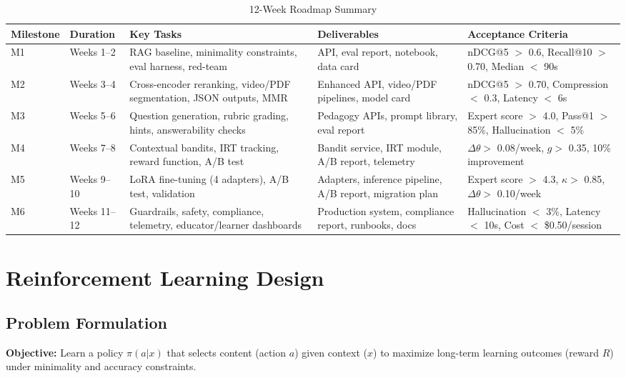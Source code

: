 \documentclass[11pt,letterpaper]{article}
\begin{document}
\begin{table}[H]
\centering
\tiny
\begin{tabular}{@{}p{1.5cm}p{2.5cm}p{4cm}p{3.5cm}p{2.5cm}@{}}
\toprule
\textbf{Milestone} & \textbf{Duration} & \textbf{Key Tasks} & \textbf{Deliverables} & \textbf{Acceptance Criteria} \\
\midrule
M1 & Weeks 1--2 & RAG baseline, minimality constraints, eval harness, red-team & API, eval report, notebook, data card & nDCG@5 $>$ 0.6, Recall@10 $>$ 0.70, Median $<$ 90s \\
M2 & Weeks 3--4 & Cross-encoder reranking, video/PDF segmentation, JSON outputs, MMR & Enhanced API, video/PDF pipelines, model card & nDCG@5 $>$ 0.70, Compression $<$ 0.3, Latency $<$ 6s \\
M3 & Weeks 5--6 & Question generation, rubric grading, hints, answerability checks & Pedagogy APIs, prompt library, eval report & Expert score $>$ 4.0, Pass@1 $>$ 85\%, Hallucination $<$ 5\% \\
M4 & Weeks 7--8 & Contextual bandits, IRT tracking, reward function, A/B test & Bandit service, IRT module, A/B report, telemetry & $\Delta\theta >$ 0.08/week, $g >$ 0.35, 10\% improvement \\
M5 & Weeks 9--10 & LoRA fine-tuning (4 adapters), A/B test, validation & Adapters, inference pipeline, A/B report, migration plan & Expert score $>$ 4.3, $\kappa >$ 0.85, $\Delta\theta >$ 0.10/week \\
M6 & Weeks 11--12 & Guardrails, safety, compliance, telemetry, educator/learner dashboards & Production system, compliance report, runbooks, docs & Hallucination $<$ 3\%, Latency $<$ 10s, Cost $<$ \$0.50/session \\
\bottomrule
\end{tabular}
\caption{12-Week Roadmap Summary}
\end{table}

\newpage

\section{Reinforcement Learning Design}

\subsection{Problem Formulation}

\textbf{Objective:} Learn a policy $\pi(a|x)$ that selects content (action $a$) given context ($x$) to maximize long-term learning outcomes (reward $R$) under minimality and accuracy constraints.
\end{document}
